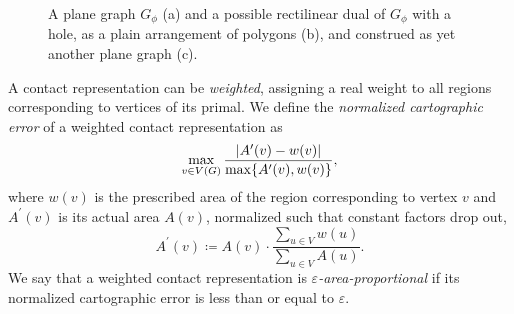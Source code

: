 \begin{figure}[H]
	\centering
	\quad
	\quad
	\caption{A plane graph $G_\phi$ (a) and a possible rectilinear dual of $G_\phi$ with a hole, as a plain arrangement of polygons (b), and construed as yet another plane graph (c).}
	\label{fig:preliminaries-rectilinear-dual}
\end{figure}

A contact representation can be \emph{weighted}, assigning a real weight to all regions corresponding to vertices of its primal.
We define the \emph{normalized cartographic error} \cite{alam2015quantitative} of a weighted contact representation as
%
\begin{equation*}
    \max\limits_{v \in V(G)} \frac{\left\lvert A^\prime(v) - w(v)\right\rvert}{\max\{A^\prime(v),w(v)\}},
\end{equation*}
%
where $w(v)$ is the prescribed area of the region corresponding to vertex $v$ and $A^\prime(v)$ is its actual area $A(v)$, normalized such that constant factors drop out, \ie{}
%
\begin{equation*}
	A^\prime(v) \coloneqq A(v) \cdot \frac{\sum\limits_{u \in V}{w(u)}}{\sum\limits_{u \in V}{A(u)}}.
\end{equation*}
%
We say that a weighted contact representation is \emph{$\varepsilon$-area-proportional} if its normalized cartographic error is less than or equal to $\varepsilon$.



